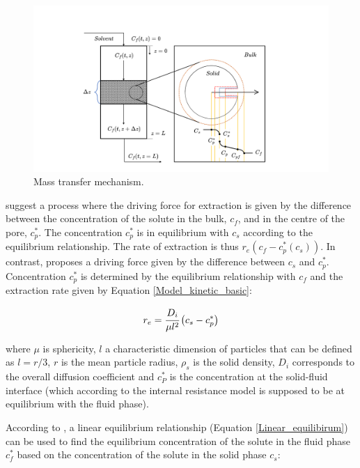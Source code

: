 \documentclass[a4paper,fleqn]{cas-dc}
\begin{document}
		\begin{figure}[h!]
			\centering
			\includegraphics[trim = 45cm 0cm 60cm 20cm,clip,width=0.85\columnwidth]{Figures/SFE_PFD.drawio.png}	
			\caption{Mass transfer mechanism.}
			\label{fig: SFE_Mechanism}
		\end{figure}
		
		\citet{Bulley1984} suggest a process where the driving force for extraction is given by the difference between the concentration of the solute in the bulk, $c_f$, and in the centre of the pore, $c_p^*$. The concentration $c_p^*$ is in equilibrium with $c_s$ according to the equilibrium relationship. The rate of extraction is thus $r_e\left(c_f - c^*_p(c_s)\right)$. In contrast, \citet{Reverchon1996} proposes a driving force given by the difference between $c_s$ and $c_p^*$. Concentration $c_p^*$ is determined by the equilibrium relationship with $c_f$ and the extraction rate given by Equation \ref{Model_kinetic_basic}:
		
		{\footnotesize
			\begin{equation} \label{Model_kinetic_basic}
				r_e = \cfrac{D_i}{\mu l^2 }\left(c_s - c_p^* \right)
		\end{equation} }
		
		where $\mu$ is sphericity, $l$ a characteristic dimension of particles that can be defined as $l = r/3$, $r$ is the mean particle radius, $\rho_s$ is the solid density, $D_i$ corresponds to the overall diffusion coefficient and $c_P^*$ is the concentration at the solid-fluid interface (which according to the internal resistance model is supposed to be at equilibrium with the fluid phase). 
		
		According to \citet{Bulley1984}, a linear equilibrium relationship (Equation \ref{Linear_equilibirum}) can be used to find the equilibrium concentration of the solute in the fluid phase $c_f^*$ based on the concentration of the solute in the solid phase $c_s$:
		
\end{document}

